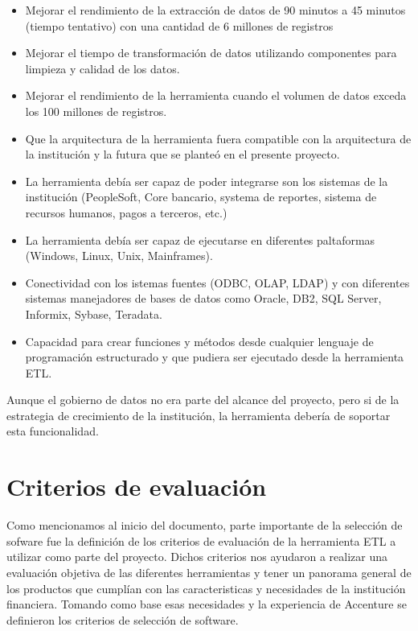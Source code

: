 \begin{itemize}

\item Mejorar el rendimiento de la extracción de datos de 90 minutos a 45
  minutos (tiempo tentativo) con una cantidad de 6 millones de registros

\item Mejorar el tiempo de transformación de datos utilizando componentes para
  limpieza y calidad de los datos.

\item Mejorar el rendimiento de la herramienta cuando el volumen de datos exceda
  los 100 millones de registros.

\item Que la arquitectura de la herramienta fuera compatible con la arquitectura
  de la institución y la futura que se planteó en el presente proyecto.

\item La herramienta debía ser capaz de poder integrarse son los sistemas de la
  institución (PeopleSoft, Core bancario, systema de reportes, sistema de
  recursos humanos, pagos a terceros, etc.)

\item La herramienta debía ser capaz de ejecutarse en diferentes paltaformas
  (Windows, Linux, Unix, Mainframes).

\item Conectividad con los istemas fuentes (ODBC, OLAP, LDAP) y con diferentes
  sistemas manejadores de bases de datos como Oracle, DB2, SQL Server, Informix,
  Sybase, Teradata.

\item Capacidad para crear funciones y métodos desde cualquier lenguaje de
  programación estructurado y que pudiera ser ejecutado desde la herramienta
  ETL.
\end{itemize}

Aunque el gobierno de datos no era parte del alcance del proyecto, pero si de la
estrategia de crecimiento de la institución, la herramienta debería de soportar
esta funcionalidad.

\section{Criterios de evaluación}

Como mencionamos al inicio del documento, parte importante de la selección de sofware fue la definición de los criterios de evaluación de la herramienta ETL a utilizar como parte del proyecto. Dichos criterios nos ayudaron a realizar una evaluación objetiva de las diferentes herramientas y tener un panorama general de los productos que cumplían con las caracteristicas y necesidades de la institución financiera. Tomando como base esas necesidades y la experiencia de Accenture se definieron los criterios de selección de software.

